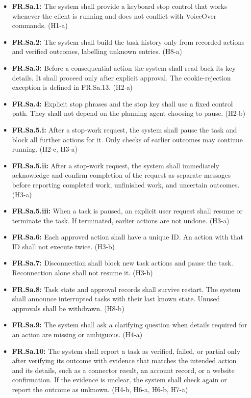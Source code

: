 \documentclass{article}
\begin{document}
\begin{itemize}
  \item \textbf{FR.Sa.1:} The system shall provide a keyboard stop control that works whenever the client is running and does not conflict with VoiceOver commands. (H1-a)
  \item \textbf{FR.Sa.2:} The system shall build the task history only from recorded actions and verified outcomes, labelling unknown entries. (H8-a)
  \item \textbf{FR.Sa.3:} Before a consequential action the system shall read back its key details. It shall proceed only after explicit approval. The cookie-rejection exception is defined in FR.Sa.13. (H2-a)
  \item \textbf{FR.Sa.4:} Explicit stop phrases and the stop key shall use a fixed control path. They shall not depend on the planning agent choosing to pause. (H2-b)
  \item \textbf{FR.Sa.5.i:} After a stop-work request, the system shall pause the task and block all further actions for it. Only checks of earlier outcomes may continue running. (H2-c, H3-a)
  \item \textbf{FR.Sa.5.ii:} After a stop-work request, the system shall immediately acknowledge and confirm completion of the request as separate messages before reporting completed work, unfinished work, and uncertain outcomes. (H3-a)
  \item \textbf{FR.Sa.5.iii:} When a task is paused, an explicit user request shall resume or terminate the task. If terminated, earlier actions are not undone. (H3-a)
  \item \textbf{FR.Sa.6:} Each approved action shall have a unique ID. An action with that ID shall not execute twice. (H3-b)
  \item \textbf{FR.Sa.7:} Disconnection shall block new task actions and pause the task. Reconnection alone shall not resume it. (H3-b)
  \item \textbf{FR.Sa.8:} Task state and approval records shall survive restart. The system shall announce interrupted tasks with their last known state. Unused approvals shall be withdrawn. (H8-b)
  \item \textbf{FR.Sa.9:} The system shall ask a clarifying question when details required for an action are missing or ambiguous. (H4-a) 
  \item \textbf{FR.Sa.10:} The system shall report a task as verified, failed, or partial only after verifying its outcome with evidence that matches the intended action and its details, such as a connector result, an account record, or a website confirmation. If the evidence is unclear, the system shall check again or report the outcome as unknown. (H4-b, H6-a, H6-b, H7-a)

\end{itemize}
\end{document}
